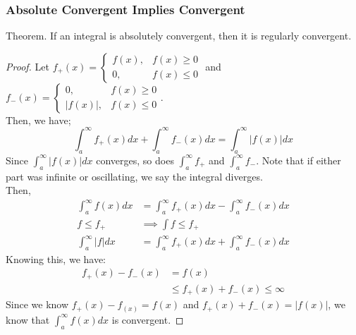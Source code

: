 \documentclass{article}
\begin{document}
\subsubsection{Absolute Convergent Implies Convergent}
Theorem. If an integral is absolutely convergent, then it is regularly convergent.
\begin{proof}
    Let $f_+(x) = \begin{cases} f(x), & f(x) \geq 0\\
    0, & f(x) \leq 0
    \end{cases}$ and $f_-(x) = \begin{cases} 0, & f(x) \geq 0\\
    |f(x)|, & f(x) \leq 0
    \end{cases}$.\\
    Then, we have;
    $$\int_a^\infty f_+(x) dx + \int_a^\infty f_-(x) dx = \int_a^\infty |f(x)| dx$$
    Since $\int_a^\infty |f(x)| dx$ converges, so does $\int_a^\infty f_+$ and $\int_a^\infty f_-$. Note that if either part was infinite or oscillating, we say the integral diverges.\\
    Then,
    \begin{align*}
        \int_a^\infty f(x) dx & = \int_a^\infty f_+(x) dx - \int_a^\infty f_-(x) dx\\
        f \leq f_+ & \implies \int f \leq f_+\\
        \int_a^\infty |f| dx & = \int_a^\infty f_+(x) dx + \int_a^\infty f_-(x) dx
    \end{align*}
    Knowing this, we have:
    \begin{align*}
        f_+(x) - f_-(x) & = f(x)\\
        & \leq f_+(x) + f_-(x) \leq \infty
    \end{align*}
    Since we know $f_+(x) - f_(x) = f(x)$ and $f_+(x) + f_-(x) = |f(x)|$, we know that $\int_a^\infty f(x) dx$ is convergent. 
\end{proof}
\end{document}
